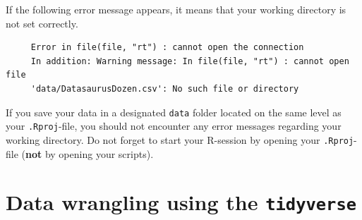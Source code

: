 \documentclass[
  letterpaper,
  DIV=11,
  numbers=noendperiod,
  oneside]{scrreprt}
\begin{document}
\begin{tcolorbox}[enhanced jigsaw, colframe=quarto-callout-tip-color-frame, bottomrule=.15mm, left=2mm, arc=.35mm, toprule=.15mm, opacityback=0, colback=white, rightrule=.15mm, breakable, leftrule=.75mm]
\begin{minipage}[t]{5.5mm}
\textcolor{quarto-callout-tip-color}{\faLightbulb}
\end{minipage}%
\begin{minipage}[t]{\textwidth - 5.5mm}

If the following error message appears, it means that your working
directory is not set correctly.

\begin{verbatim}
     Error in file(file, "rt") : cannot open the connection         
     In addition: Warning message: In file(file, "rt") : cannot open file                            
     'data/DatasaurusDozen.csv': No such file or directory
\end{verbatim}

\end{minipage}%
\end{tcolorbox}

\begin{tcolorbox}[enhanced jigsaw, colframe=quarto-callout-important-color-frame, bottomrule=.15mm, left=2mm, arc=.35mm, toprule=.15mm, opacityback=0, colback=white, rightrule=.15mm, breakable, leftrule=.75mm]
\begin{minipage}[t]{5.5mm}
\textcolor{quarto-callout-important-color}{\faExclamation}
\end{minipage}%
\begin{minipage}[t]{\textwidth - 5.5mm}

If you save your data in a designated \texttt{data} folder located on
the same level as your \texttt{.Rproj}-file, you should not encounter
any error messages regarding your working directory. Do not forget to
start your R-session by opening your \texttt{.Rproj}-file (\textbf{not}
by opening your scripts).

\end{minipage}%
\end{tcolorbox}


\hypertarget{data-wrangling-using-the-tidyverse}{%
\chapter{\texorpdfstring{Data wrangling using the
\texttt{tidyverse}}{Data wrangling using the tidyverse}}\label{data-wrangling-using-the-tidyverse}}
\end{document}
